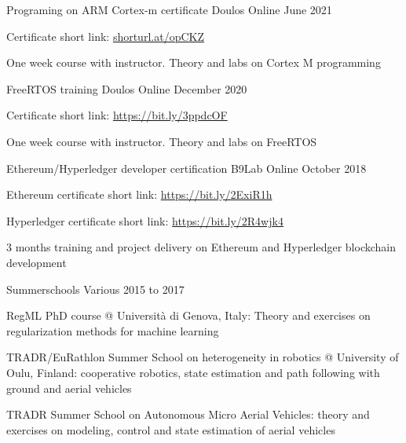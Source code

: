 \cventry
{Programing on ARM Cortex-m certificate} %
{Doulos} %
{Online} %
{June 2021} %
{
  \begin{cvitems} %
    \item{Certificate short link: \url{shorturl.at/opCKZ}}
  \end{cvitems}
  \vspace{16pt}
  \begin{cvparagraph}
    One week course with instructor. Theory and labs on Cortex M programming
  \end{cvparagraph}
  \vspace*{-25pt}
}
\cventry
{FreeRTOS training} %
{Doulos} %
{Online} %
{December 2020} %
{
  \begin{cvitems} %
    \item{Certificate short link: \url{https://bit.ly/3ppdcOF}}
  \end{cvitems}
  \vspace{16pt}
  \begin{cvparagraph}
    One week course with instructor. Theory and labs on FreeRTOS
  \end{cvparagraph}
  \vspace*{-20pt}
}
\cventry
{Ethereum/Hyperledger developer certification} %
{B9Lab} %
{Online} %
{October 2018} %
{
  \begin{cvitems} %
    \item{Ethereum certificate short link: \url{https://bit.ly/2ExiR1h}}
    \item{Hyperledger certificate short link: \url{https://bit.ly/2R4wjk4}}
  \end{cvitems}
  \vspace{16pt}
  \begin{cvparagraph}
    3 months training and project delivery on Ethereum and Hyperledger blockchain development
  \end{cvparagraph}
  \vspace*{-20pt}
}
\cventry
{Summerschools} %
{Various} %
{} %
{2015 to 2017} %
{
  \begin{cvitems} %
    \item{RegML PhD course @ Università di Genova, Italy: Theory and exercises on regularization methods for machine learning}
    \item{TRADR/EuRathlon Summer School on heterogeneity in robotics @ University of Oulu, Finland: cooperative robotics, state estimation and path following with ground and aerial vehicles}
    \item{TRADR Summer School on Autonomous Micro Aerial Vehicles: theory and exercises on modeling, control and state estimation of aerial vehicles}
  \end{cvitems}
  \vspace*{15pt}
}
